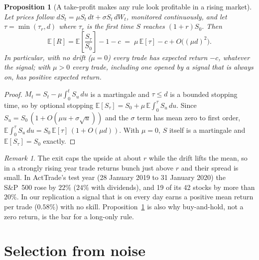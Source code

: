 \documentclass[11pt,a4paper]{article}
\newtheorem{proposition}{Proposition}
\theoremstyle{remark}
\newtheorem*{remark}{Remark}
\newcommand{\E}{\mathbb{E}}
\begin{document}
\begin{proposition}[A take-profit makes any rule look profitable in a rising market]\label{prop:drift}
Let prices follow $dS_t = \mu S_t\,dt+\sigma S_t\,dW_t$, monitored continuously, and let $\tau = \min(\tau_r, d)$ where $\tau_r$ is the first time $S$ reaches $(1+r)S_0$. Then
\begin{equation}
\E[R] = \E\!\left[\frac{S_\tau}{S_0}\right]-1-c \;=\; \mu\,\E[\tau]-c + O\big((\mu d)^2\big).
\end{equation}
In particular, with no drift ($\mu=0$) every trade has expected return $-c$, whatever the signal; with $\mu>0$ every trade, including one opened by a signal that is always on, has positive expected return.
\end{proposition}
\begin{proof}
$M_t = S_t - \mu\int_0^t S_u\,du$ is a martingale and $\tau\le d$ is a bounded stopping time, so by optional stopping $\E[S_\tau] = S_0 + \mu\,\E\!\int_0^\tau S_u\,du$. Since $S_u = S_0\,(1+O(\mu u + \sigma\sqrt{u}))$ and the $\sigma$ term has mean zero to first order, $\E\!\int_0^\tau S_u\,du = S_0\,\E[\tau]\,(1+O(\mu d))$. With $\mu=0$, $S$ itself is a martingale and $\E[S_\tau]=S_0$ exactly.
\end{proof}

\begin{remark}
The exit caps the upside at about $r$ while the drift lifts the mean, so in a strongly rising year trade returns bunch just above $r$ and their spread is small. In ActTrade's test year (28 January 2019 to 31 January 2020) the S\&P~500 rose by $22\%$ ($24\%$ with dividends), and 19 of its 42 stocks by more than $20\%$. In our replication a signal that is on every day earns a positive mean return per trade ($0.58\%$) with no skill. Proposition~\ref{prop:drift} is also why buy-and-hold, not a zero return, is the bar for a long-only rule.
\end{remark}

\section{Selection from noise}
\end{document}
